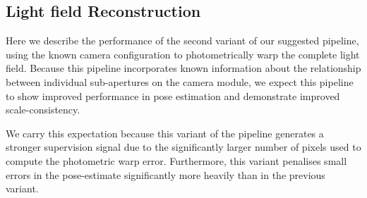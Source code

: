 \subsection{Light field Reconstruction}

Here we describe the performance of the second variant of our suggested pipeline, using the known camera configuration to photometrically warp the complete light field. Because this pipeline incorporates known information about the relationship between individual sub-apertures on the camera module, we expect this pipeline to show improved performance in pose estimation and demonstrate improved scale-consistency.

We carry this expectation because this variant of the pipeline generates a stronger supervision signal due to the significantly larger number of pixels used to compute the photometric warp error. Furthermore, this variant penalises small errors in the pose-estimate significantly more heavily than in the previous variant. 

